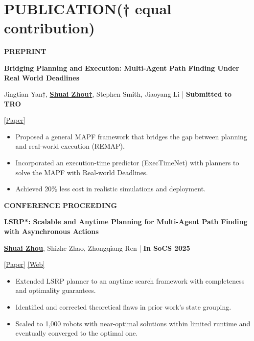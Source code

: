 \documentclass[a4paper,9pt]{extarticle}
\begin{document}
\section*{{\textbf{\fontsize{14pt}{8pt}\selectfont P}\textbf{\scshape UBLICATION}}(† equal contribution)}
{\textbf{\fontsize{12pt}{4pt}\selectfont P}\textbf{\scshape REPRINT}}
\par\vspace{4pt}\noindent
\par\textbf{Bridging Planning and Execution: Multi-Agent Path Finding Under Real World Deadlines}
\par\textup{Jingtian Yan†, \underline{\textbf{Shuai Zhou†}}, Stephen Smith, Jiaoyang Li  \hfill | \textbf{Submitted to TRO}}
\par\textup{\textbar{} \href{https://arxiv.org/abs/2511.21886}{[Paper]} \textbar{}} 
\begin{itemize} 
    \item Proposed a general MAPF framework that bridges the gap between planning and real-world execution (REMAP). 
    \item Incorporated an execution-time predictor (ExecTimeNet) with planners to solve the MAPF with Real-world Deadlines.
    \item Achieved 20\% less cost in realistic simulations and deployment.
\end{itemize} 
{\textbf{\fontsize{12pt}{4pt}\selectfont C}\textbf{\scshape ONFERENCE PROCEEDING}}
\par\vspace{4pt}\noindent
\par\textbf{LSRP*: Scalable and Anytime Planning for Multi-Agent Path Finding with Asynchronous Actions}
\par\textup{\underline{\textbf{Shuai Zhou}}, Shizhe Zhao, Zhongqiang Ren  \hfill | \textbf{In SoCS 2025}}   %
\par\textup{\textbar{} \href{https://doi.org/10.1609/socs.v18i1.36016}{[Paper]} \textbar{} \href{https://rap-lab.github.io/research/mapfaa}{[Web]} \textbar{}}
\begin{itemize} 
    \item Extended LSRP planner to an anytime search framework with completeness and optimality guarantees.
    \item Identified and corrected theoretical flaws in prior work's state grouping.
    \item Scaled to 1,000 robots with near-optimal solutions within limited runtime and eventually converged to the optimal one. 
\end{itemize} 
\end{document}
